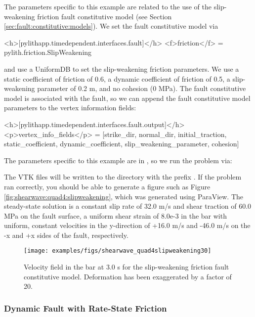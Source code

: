 The parameters specific to this example are related to the use of
the slip-weakening friction fault constitutive model (see Section
\vref{sec:fault:constitutive:models}). We set the fault constitutive
model via
\begin{cfg}
<h>[pylithapp.timedependent.interfaces.fault]</h>
<f>friction</f> = pylith.friction.SlipWeakening
\end{cfg}
and use a UniformDB to set the slip-weakening friction parameters.
We use a static coefficient of friction of 0.6, a dynamic coefficient
of friction of 0.5, a slip-weakening parameter of 0.2 m, and no cohesion
(0 MPa). The fault constitutive model is associated with the fault,
so we can append the fault constitutive model parameters to the vertex
information fields:
\begin{cfg}
<h>[pylithapp.timedependent.interfaces.fault.output]</h>
<p>vertex_info_fields</p> = [strike_dir, normal_dir, initial_traction, static_coefficient, dynamic_coefficient, slip_weakening_parameter, cohesion]
\end{cfg}
The parameters specific to this example are in ,
so we run the problem via:
The VTK files will be written to the  directory with
the prefix . If the problem ran correctly, you
should be able to generate a figure such as Figure \vref{fig:shearwave:quad4:slipweakening},
which was generated using ParaView. The steady-state solution is a
constant slip rate of 32.0 m/s and shear traction of 60.0 MPa on the
fault surface, a uniform shear strain of 8.0e-3 in the bar with uniform,
constant velocities in the y-direction of +16.0 m/s and -46.0 m/s
on the -x and +x sides of the fault, respectively.

\begin{figure}
  \texttt{[image: examples/figs/shearwave\_quad4slipweakening30]}
  \caption{Velocity field in the bar at 3.0 s for the slip-weakening friction
    fault constitutive model. Deformation has been exaggerated by a factor
    of 20.}
  \label{fig:shearwave:quad4:slipweakening}
\end{figure}


\subsubsection{Dynamic Fault with Rate-State Friction}

